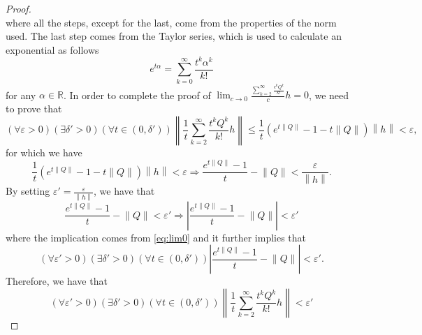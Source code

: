 \documentclass{article}
\newcommand{\reals}{\mathbb{R}}
\newcommand{\norm}[1]{\left\lVert #1 \right\rVert}
\newcommand{\abs}[1]{\left\vert #1 \right\vert}
\newcommand{\de}{\delta}
\newcommand{\ve}{\varepsilon}
\begin{document}
\begin{proof}
\begin{equation*}
\end{equation*}
where all the steps, except for the last, come from the properties of the norm used.
The last step comes from the Taylor series, which is used to calculate an exponential as follows
\begin{equation} \label{taylor}
e^{t\alpha}=\sum_{k=0}^{\infty}\frac{t^{k}\alpha^{k}}{k!}
\end{equation}
for any $\alpha\in\reals$.
In order to complete the proof of $\lim_{c\to0}{\frac{\sum_{k=2}^{\infty}{\frac{c^{k}Q^{k}}{k!}}}{c}h}=0$, we need to prove that
\begin{equation} \label{eq:lim0}
(\forall\ve>0)(\exists \de'>0)(\forall t \in(0,\de'))\norm{\frac{1}{t}\sum_{k=2}^{\infty}{\frac{t^{k}Q^{k}}{k!}}h}\leq\frac{1}{t}(e^{t\norm{Q}}-1-t\norm{Q})\norm{h}<\ve,
\end{equation}
for which we have
\begin{equation*}
\frac{1}{t}(e^{t\norm{Q}}-1-t\norm{Q})\norm{h}<\ve\Rightarrow \frac{e^{t\norm{Q}}-1}{t}-\norm{Q}<\frac{\ve}{\norm{h}}.
\end{equation*}
By setting $\ve'=\frac{\ve}{\norm{h}}$, we have that
\begin{equation*}
\frac{e^{t\norm{Q}}-1}{t}-\norm{Q}<\ve'\Rightarrow \abs{\frac{e^{t\norm{Q}}-1}{t}-\norm{Q}}<\ve'
\end{equation*}
where the implication comes from \eqref{eq:lim0} and it further implies that
\begin{equation*}
(\forall\ve'>0)(\exists \de'>0)(\forall t \in(0,\de'))\abs{\frac{e^{t\norm{Q}}-1}{t}-\norm{Q}}<\ve'.
\end{equation*}
Therefore, we have that
\begin{equation*}
(\forall\ve'>0)(\exists \de'>0)(\forall t \in(0,\de'))\norm{\frac{1}{t}\sum_{k=2}^{\infty}{\frac{t^{k}Q^{k}}{k!}}h}<\ve'
\end{equation*}


\end{proof}
\end{document}
